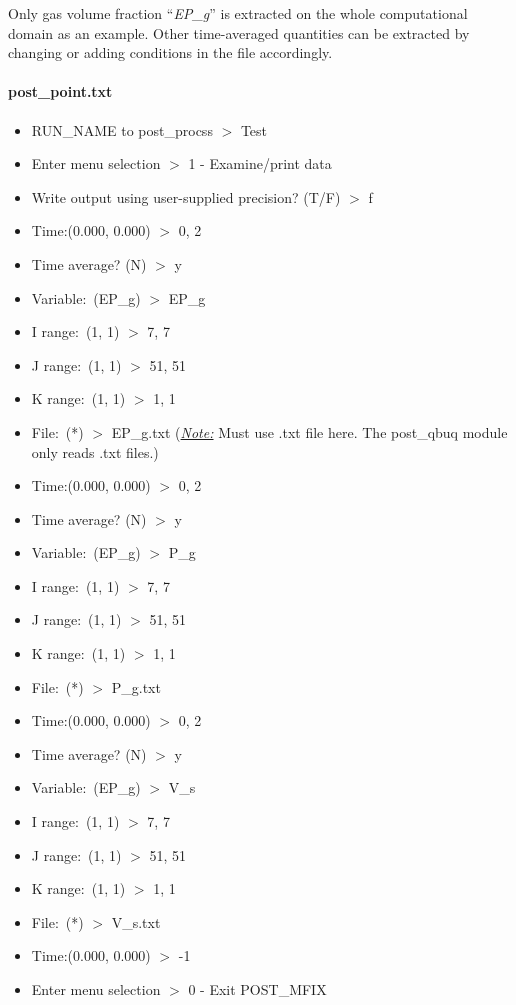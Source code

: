 \documentclass[a4paper,12pt,titlepage]{article}
\begin{document}
Only gas volume fraction ``\emph{EP\_g}'' is extracted on the whole 
computational domain as an example. Other time-averaged quantities can be 
extracted by changing or adding conditions in the file accordingly. 

\paragraph*{post\_point.txt}

\begin{itemize}
 \item RUN\_NAME to post\_procss $>$ Test
 \item Enter menu selection $>$ 1 - Examine/print data
 \item Write output using user-supplied precision? (T/F) $>$ f
 \item Time:(0.000, 0.000) $>$ 0, 2
 \item Time average? (N) $>$ y
 \item Variable:\ (EP\_g) $>$ EP\_g
 \item I range:\ (1, 1) $>$ 7, 7
 \item J range:\ (1, 1) $>$ 51, 51
 \item K range:\ (1, 1) $>$ 1, 1
 \item File:\ (*) $>$ EP\_g.txt (\emph{\underline{Note:}} Must use .txt 
 file here. The post\_qbuq module only reads .txt files.)
 \item Time:(0.000, 0.000) $>$ 0, 2
 \item Time average? (N) $>$ y
 \item Variable:\ (EP\_g) $>$ P\_g
 \item I range:\ (1, 1) $>$ 7, 7
 \item J range:\ (1, 1) $>$ 51, 51
 \item K range:\ (1, 1) $>$ 1, 1
 \item File:\ (*) $>$ P\_g.txt
 \item Time:(0.000, 0.000) $>$ 0, 2
 \item Time average? (N) $>$ y
 \item Variable:\ (EP\_g) $>$ V\_s
 \item I range:\ (1, 1) $>$ 7, 7
 \item J range:\ (1, 1) $>$ 51, 51
 \item K range:\ (1, 1) $>$ 1, 1
 \item File:\ (*) $>$ V\_s.txt 
 \item Time:(0.000, 0.000) $>$ -1
 \item Enter menu selection $>$ 0 - Exit POST\_MFIX
\end{itemize}
\end{document}
